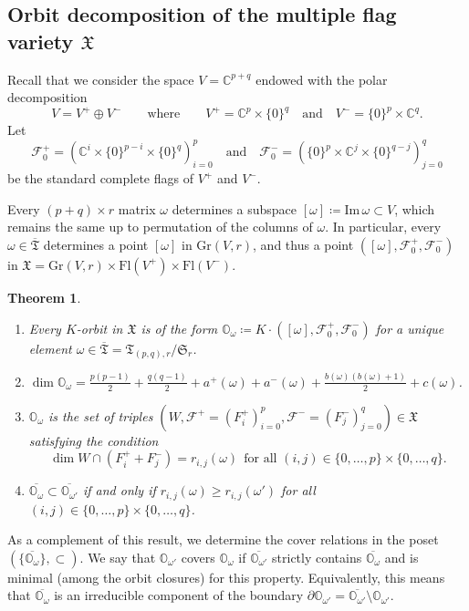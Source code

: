 \documentclass[11pt]{article}
\newtheorem{theorem}[theo]{Theorem}
\theoremstyle{definition}
\numberwithin{equation}{section}
\newcommand{\flag}{\mathcal{F}}
\newcommand{\Xorbit}{\mathbb{O}}
\newcommand{\permutationsof}[1]{\mathfrak{S}_{#1}}
\newcommand{\ppermutationsof}{\mathfrak{T}}
\newcommand{\parameters}{\overline{\ppermutationsof}}
\newcommand{\Xfv}{\mathfrak{X}}
\newcommand{\Grass}{\mathrm{Gr}}
\newcommand{\Flags}{\mathrm{Fl}}
\newcommand{\mC}{\mathbb{C}}
\begin{document}
\subsection{Orbit decomposition of the multiple flag variety $\Xfv$}

\label{section-2.2}

Recall that we consider the space $V=\mC^{p+q}$ endowed with the polar decomposition
\[V=V^+\oplus V^-\qquad\mbox{where}\qquad V^+=\mC^p\times\{0\}^q\quad\mbox{and}\quad V^-=\{0\}^p\times \mC^q.\]
Let
\[
\flag_0^+=(\mC^i\times\{0\}^{p-i}\times\{0\}^q)_{i=0}^p
\quad\mbox{and}\quad
\flag_0^-=(\{0\}^{p}\times\mC^j\times\{0\}^{q-j})_{j=0}^q
\]
be the standard complete flags of $V^+$ and $V^-$.

Every  $(p+q)\times r$ matrix $\omega$ determines a subspace $[\omega]\coloneqq \mathrm{Im}\,\omega\subset V$, which remains the same up to permutation of the columns of $\omega$.
In particular, every $\omega\in\parameters$ determines a point $[\omega]$ in $\Grass(V,r)$, and thus a point $([\omega],\flag_0^+,\flag_0^-)$ in $\Xfv=\Grass(V,r)\times\Flags(V^+)\times\Flags(V^-)$.

\begin{theorem}
\begin{enumerate}[label=(\arabic*)]
\item\label{Tp11} Every $K$-orbit in $\Xfv$ is of the form $\Xorbit_\omega\coloneqq K\cdot([\omega],\flag_0^+,\flag_0^-)$ for a unique element $\omega\in\parameters=\ppermutationsof_{(p,q),r}/\permutationsof{r}$.
\item \label{Tp12} $\dim\Xorbit_\omega=\frac{p(p-1)}{2}+\frac{q(q-1)}{2}+a^+(\omega)+a^-(\omega)+\frac{b(\omega)(b(\omega)+1)}{2}+c(\omega)$.
\item \label{Tp13} $\Xorbit_\omega$ is the set of triples $(W,\flag^+=(F^+_i)_{i=0}^p,\flag^-=(F_j^-)_{j=0}^q)\in\Xfv$
satisfying the condition
\[\dim W\cap(F_i^++F_j^-)=r_{i,j}(\omega)\ \ \mbox{for all $(i,j)\in\{0,\ldots,p\}\times\{0,\ldots,q\}$}.\]
 \item \label{Tp14} $\overline{\Xorbit_\omega}\subset\overline{\Xorbit_{\omega'}}$ if and only if $r_{i,j}(\omega)\geq r_{i,j}(\omega')$ for all $(i,j)\in\{0,\ldots,p\}\times\{0,\ldots,q\}$.
\end{enumerate}
\label{Tp1}
\end{theorem}

As a complement of this result, we determine the cover relations in the poset $(\{\overline{\Xorbit_\omega}\},\subset)$. We say that $\Xorbit_{\omega'}$ covers $\Xorbit_\omega$ if $\overline{\Xorbit_{\omega'}}$ strictly contains $\overline{\Xorbit_\omega}$ and is minimal (among the orbit closures) for this property.
Equivalently, this means that $\overline{\Xorbit_\omega}$ is an irreducible component of the boundary
$\partial\Xorbit_{\omega'}=\overline{\Xorbit_{\omega'}}\setminus \Xorbit_{\omega'}$.
\end{document}
